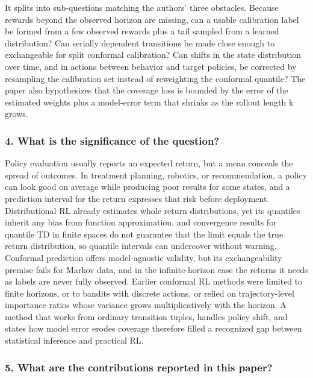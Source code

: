\documentclass[11pt]{article}
\newcommand{\question}[1]{\subsubsection*{#1}}
\begin{document}
It splits into sub-questions matching the authors' three obstacles. Because rewards beyond the observed horizon are missing, can a usable calibration label be formed from a few observed rewards plus a tail sampled from a learned distribution? Can serially dependent transitions be made close enough to exchangeable for split conformal calibration? Can shifts in the state distribution over time, and in actions between behavior and target policies, be corrected by resampling the calibration set instead of reweighting the conformal quantile? The paper also hypothesizes that the coverage loss is bounded by the error of the estimated weights plus a model-error term that shrinks as the rollout length k grows.

\question{4. What is the significance of the question?}

Policy evaluation usually reports an expected return, but a mean conceals the spread of outcomes. In treatment planning, robotics, or recommendation, a policy can look good on average while producing poor results for some states, and a prediction interval for the return expresses that risk before deployment. Distributional RL already estimates whole return distributions, yet its quantiles inherit any bias from function approximation, and convergence results for quantile TD in finite spaces do not guarantee that the limit equals the true return distribution, so quantile intervals can undercover without warning. Conformal prediction offers model-agnostic validity, but its exchangeability premise fails for Markov data, and in the infinite-horizon case the returns it needs as labels are never fully observed. Earlier conformal RL methods were limited to finite horizons, or to bandits with discrete actions, or relied on trajectory-level importance ratios whose variance grows multiplicatively with the horizon. A method that works from ordinary transition tuples, handles policy shift, and states how model error erodes coverage therefore filled a recognized gap between statistical inference and practical RL.

\question{5. What are the contributions reported in this paper?}
\end{document}
